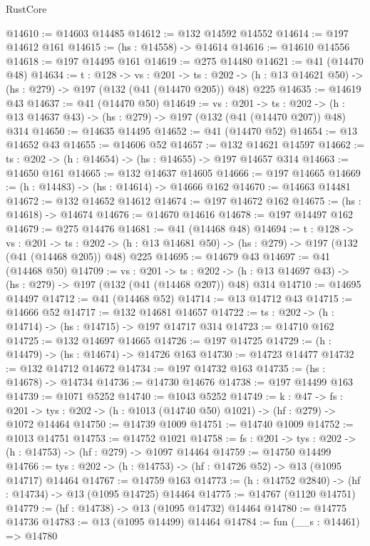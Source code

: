 \begin{lexlean}{RustCore}
\begin{coremodule}
@14610 := @14603 @14485
@14612 := @132 @14592 @14552
@14614 := @197 @14612 @161
@14615 := (hs : @14558) -> @14614
@14616 := @14610 @14556
@14618 := @197 @14495 @161
@14619 := @275 @14480
@14621 := @41 (@14470 @48)
@14634 := {t : @128} ->
  {vs : @201} ->
  {ts : @202} -> (h : @13 @14621 @50) -> (hs : @279) -> @197 (@132 (@41 (@14470 @205)) @48) @225
@14635 := @14619 @43
@14637 := @41 (@14470 @50)
@14649 := {vs : @201} ->
  {ts : @202} -> (h : @13 @14637 @43) -> (hs : @279) -> @197 (@132 (@41 (@14470 @207)) @48) @314
@14650 := @14635 @14495
@14652 := @41 (@14470 @52)
@14654 := @13 @14652 @43
@14655 := @14606 @52
@14657 := @132 @14621 @14597
@14662 := {ts : @202} -> (h : @14654) -> (hs : @14655) -> @197 @14657 @314
@14663 := @14650 @161
@14665 := @132 @14637 @14605
@14666 := @197 @14665
@14669 := (h : @14483) -> (hs : @14614) -> @14666 @162
@14670 := @14663 @14481
@14672 := @132 @14652 @14612
@14674 := @197 @14672 @162
@14675 := (hs : @14618) -> @14674
@14676 := @14670 @14616
@14678 := @197 @14497 @162
@14679 := @275 @14476
@14681 := @41 (@14468 @48)
@14694 := {t : @128} ->
  {vs : @201} ->
  {ts : @202} -> (h : @13 @14681 @50) -> (hs : @279) -> @197 (@132 (@41 (@14468 @205)) @48) @225
@14695 := @14679 @43
@14697 := @41 (@14468 @50)
@14709 := {vs : @201} ->
  {ts : @202} -> (h : @13 @14697 @43) -> (hs : @279) -> @197 (@132 (@41 (@14468 @207)) @48) @314
@14710 := @14695 @14497
@14712 := @41 (@14468 @52)
@14714 := @13 @14712 @43
@14715 := @14666 @52
@14717 := @132 @14681 @14657
@14722 := {ts : @202} -> (h : @14714) -> (hs : @14715) -> @197 @14717 @314
@14723 := @14710 @162
@14725 := @132 @14697 @14665
@14726 := @197 @14725
@14729 := (h : @14479) -> (hs : @14674) -> @14726 @163
@14730 := @14723 @14477
@14732 := @132 @14712 @14672
@14734 := @197 @14732 @163
@14735 := (hs : @14678) -> @14734
@14736 := @14730 @14676
@14738 := @197 @14499 @163
@14739 := @1071 @5252
@14740 := @1043 @5252
@14749 := {k : @47} ->
  {fs : @201} -> {tys : @202} -> (h : @1013 (@14740 @50) @1021) -> (hf : @279) -> @1072 @14464
@14750 := @14739 @1009
@14751 := @14740 @1009
@14752 := @1013 @14751
@14753 := @14752 @1021
@14758 := {fs : @201} -> {tys : @202} -> (h : @14753) -> (hf : @279) -> @1097 @14464
@14759 := @14750 @14499
@14766 := {tys : @202} -> (h : @14753) -> (hf : @14726 @52) -> @13 (@1095 @14717) @14464
@14767 := @14759 @163
@14773 := (h : @14752 @2840) -> (hf : @14734) -> @13 (@1095 @14725) @14464
@14775 := @14767 (@1120 @14751)
@14779 := (hf : @14738) -> @13 (@1095 @14732) @14464
@14780 := @14775 @14736
@14783 := @13 (@1095 @14499) @14464
@14784 := fun (__s : @14461) => @14780

\end{coremodule}
\end{lexlean}
